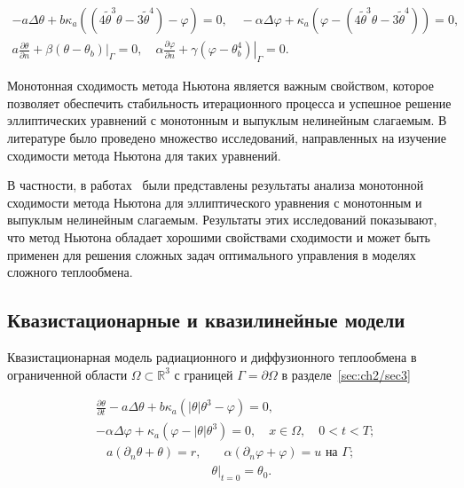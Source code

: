 \[
    \begin{gathered}
        -a \Delta \theta+b \kappa_{a}\left(\left(4 \widetilde{\theta}^{3}
        \theta-3 \widetilde{\theta}^{4}\right)-\varphi\right)=0,
        \quad-\alpha \Delta \varphi
        +\kappa_{a}\left(\varphi
        -\left(4 \widetilde{\theta}^{3}
        \theta-3 \widetilde{\theta}^{4}\right)\right)=0, \\
        a \frac{\partial \theta}{\partial n}
        +\left.\beta\left(\theta-\theta_{b}\right)\right|_{\Gamma}=0,
        \quad \alpha \frac{\partial \varphi}{\partial n}
        +\left.\gamma\left(\varphi-\theta_{b}^{4}\right)\right|_{\Gamma}=0.
    \end{gathered}
\]

Монотонная сходимость метода Ньютона является важным свойством,
которое позволяет обеспечить стабильность итерационного процесса
и успешное решение эллиптических уравнений
с монотонным и выпуклым нелинейным слагаемым.
В литературе было проведено множество исследований, направленных
на изучение сходимости метода Ньютона для таких уравнений.

В частности, в работах~\cite{Mukhamadiev1971, Schryer1971} были представлены
результаты анализа монотонной сходимости метода Ньютона для эллиптического
уравнения с монотонным и выпуклым нелинейным слагаемым.
Результаты этих исследований показывают, что метод Ньютона обладает
хорошими свойствами сходимости и может быть применен для решения
сложных задач оптимального управления в моделях сложного теплообмена.

\subsection{Квазистационарные и квазилинейные модели}
\label{subsec:ch4/sec1/quasi}

Квазистационарная модель радиационного и диффузионного теплообмена в ограниченной области
$\Omega \subset \mathbb{R}^{3}$ с границей $\Gamma=\partial \Omega$ в разделе~\ref{sec:ch2/sec3}

\begin{equation*}
    \begin{split}
        & \frac{\partial \theta}{\partial t} - a \Delta \theta
        + b \kappa_{a} \left(|\theta| \theta^{3}-\varphi\right) = 0,\\
        & - \alpha \Delta \varphi
        + \kappa_{a} \left(\varphi-|\theta| \theta^{3}\right) = 0,
        \quad x \in \Omega, \quad 0 < t < T;
    \end{split}
\end{equation*}
\begin{align}
    a \left(\partial_{n} \theta+\theta\right)=r,
    & \quad \alpha\left(\partial_{n} \varphi
    + \varphi\right) = u \text { на } \Gamma; \\
    & \left.\theta\right|_{t=0} = \theta_{0}.
\end{align}

